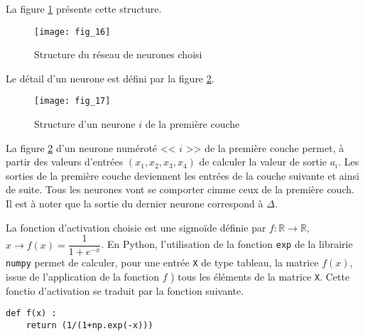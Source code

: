 La figure \ref{Cy_07_ch_02_td_01_fig_16} présente cette structure. 


\begin{figure}[!h]
\centering
\texttt{[image: fig\_16]}
\caption{Structure du réseau de neurones choisi\label{Cy_07_ch_02_td_01_fig_16}}
\end{figure}

Le détail d'un neurone est défini par la figure \ref{Cy_07_ch_02_td_01_fig_17}.

\begin{figure}[!h]
\centering
\texttt{[image: fig\_17]}
\caption{Structure d'un neurone $i$ de la première couche\label{Cy_07_ch_02_td_01_fig_17}}
\end{figure}

La figure \ref{Cy_07_ch_02_td_01_fig_17} d'un neurone numéroté << $i$ >> de la première couche permet, à partir des valeurs d'entrées $\left(x_1, x_2, x_3, x_4 \right)$ de calculer la valeur de sortie $a_i$. Les sorties de la première couche deviennent les entrées de la couche suivante et ainsi de suite. Tous les neurones vont se comporter cimme ceux de la première couch. Il est à noter que la sortie du dernier neurone correspond à $\Delta$.




La fonction d'activation choisie est une sigmoïde définie par $f: \mathbb{R} \to \mathbb{R}$, $x\to f(x) = \dfrac{1}{1+e^{-x}}$. En Python, l'utilisation de la fonction \lstinline{exp} de la librairie \lstinline{numpy} permet de calculer, pour une entrée \lstinline{X} de type tableau, la matrice $f(x)$, issue de l'application de la fonction $f$ ) tous les éléments de la matrice \lstinline{X}. Cette fonctio d'activation se traduit par la fonction suivante.
\begin{lstlisting}
def f(x) :
    return (1/(1+np.exp(-x)))
\end{lstlisting}


